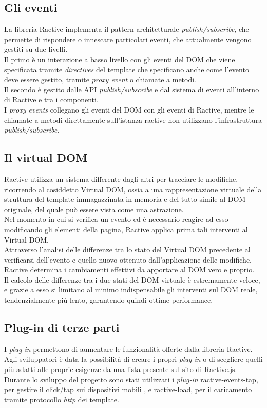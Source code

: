 \subsection{Gli eventi}
La libreria Ractive implementa il pattern architetturale  \textit{publish/subscribe}, che permette di rispondere o innescare particolari eventi, che attualmente vengono gestiti su due livelli.\\
Il primo è un interazione a basso livello con gli eventi del DOM che viene specificata tramite \textit{directives} del template che specificano anche  come l'evento deve essere gestito, tramite \textit{proxy event} o chiamate a metodi.\\
Il secondo è gestito dalle API \textit{publish/subscribe} e dal sistema di eventi all'interno di Ractive e tra i componenti.\\
I \textit{proxy events} collegano gli eventi del DOM con gli eventi di Ractive, mentre le chiamate a metodi direttamente sull'istanza ractive non utilizzano l'infrastruttura \textit{publish/subscribe}.
\subsection{Il virtual DOM}
Ractive utilizza un sistema differente dagli altri per tracciare le modifiche, ricorrendo al cosiddetto Virtual DOM, ossia a una rappresentazione virtuale della struttura del template immagazzinata in memoria e del tutto simile al DOM originale, del quale può essere vista come una astrazione.\\
Nel momento in cui si verifica un evento ed è necessario reagire ad esso modificando gli elementi della pagina, Ractive applica prima tali interventi al Virtual DOM.\\
Attraverso l’analisi delle differenze tra lo stato del Virtual DOM precedente al verificarsi dell’evento e quello nuovo ottenuto dall’applicazione delle modifiche, Ractive determina i cambiamenti effettivi da apportare al DOM vero e proprio.\\
Il calcolo delle differenze tra i due stati del DOM virtuale è estremamente veloce, e grazie a esso si limitano al minimo indispensabile gli interventi sul DOM reale, tendenzialmente più lento, garantendo quindi ottime performance.

\subsection{Plug-in di terze parti}\label{sec:packager}
I \textit{plug-in} permettono di aumentare le funzionalità offerte dalla libreria Ractive.\\
Agli sviluppatori è data la possibilità di creare i propri \textit{plug-in} o di scegliere quelli più adatti alle proprie esigenze da una lista presente sul sito di Ractive.js.\\
Durante lo sviluppo del progetto sono stati utilizzati i \textit{plug-in} \href{https://github.com/ractivejs/ractive-events-tap}{ractive-events-tap}, per gestire il click/tap sui dispositivi mobili , e \href{https://github.com/ractivejs/ractive-load}{ractive-load}, per il caricamento tramite protocollo \textit{http} dei template.   

